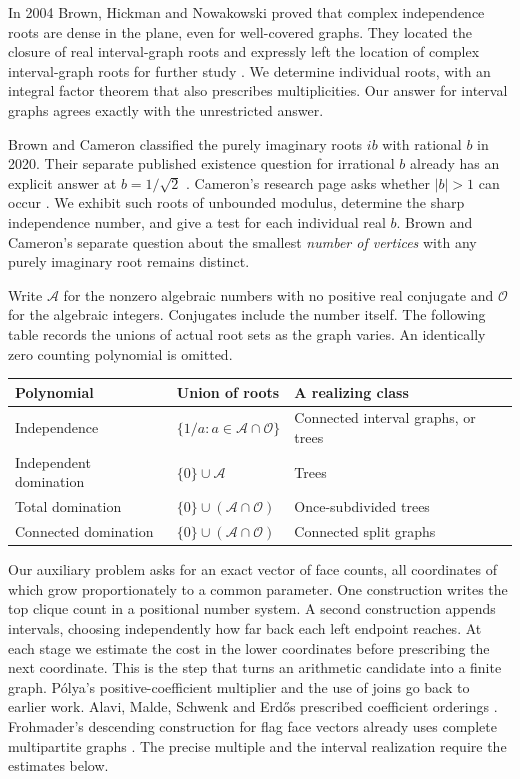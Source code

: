 \documentclass[11pt,a4paper]{article}
\begin{document}
In 2004 Brown, Hickman and Nowakowski proved that complex independence roots are dense in the plane, even for well-covered graphs. They located the closure of real interval-graph roots and expressly left the location of complex interval-graph roots for further study \cite[Section~4, p.~281]{brown2004}. We determine individual roots, with an integral factor theorem that also prescribes multiplicities. Our answer for interval graphs agrees exactly with the unrestricted answer.

Brown and Cameron classified the purely imaginary roots $ib$ with rational $b$ in 2020. Their separate published existence question for irrational $b$ already has an explicit answer at $b=1/\sqrt2$ \cite{browncameron,tru}. Cameron's research page asks whether $|b|>1$ can occur \cite{cameronweb}. We exhibit such roots of unbounded modulus, determine the sharp independence number, and give a test for each individual real $b$. Brown and Cameron's separate question about the smallest \emph{number of vertices} with any purely imaginary root remains distinct.

Write $\mathcal A$ for the nonzero algebraic numbers with no positive real conjugate and $\mathcal O$ for the algebraic integers. Conjugates include the number itself. The following table records the unions of actual root sets as the graph varies. An identically zero counting polynomial is omitted.
\begin{center}
\small
\begin{tabularx}{\linewidth}{@{}l l X@{}}
\toprule
Polynomial & Union of roots & A realizing class\\
\midrule
Independence & $\{1/a:a\in\mathcal A\cap\mathcal O\}$ & Connected interval graphs, or trees\\
Independent domination & $\{0\}\cup\mathcal A$ & Trees\\
Total domination & $\{0\}\cup(\mathcal A\cap\mathcal O)$ & Once-subdivided trees\\
Connected domination & $\{0\}\cup(\mathcal A\cap\mathcal O)$ & Connected split graphs\\
\bottomrule
\end{tabularx}
\end{center}
Our auxiliary problem asks for an exact vector of face counts, all coordinates of which grow proportionately to a common parameter. One construction writes the top clique count in a positional number system. A second construction appends intervals, choosing independently how far back each left endpoint reaches. At each stage we estimate the cost in the lower coordinates before prescribing the next coordinate. This is the step that turns an arithmetic candidate into a finite graph. P\'olya's positive-coefficient multiplier and the use of joins go back to earlier work. Alavi, Malde, Schwenk and Erd\H{o}s prescribed coefficient orderings \cite{alavi}. Frohmader's descending construction for flag face vectors already uses complete multipartite graphs \cite[Section~5]{frohmader}. The precise multiple and the interval realization require the estimates below.
\end{document}
